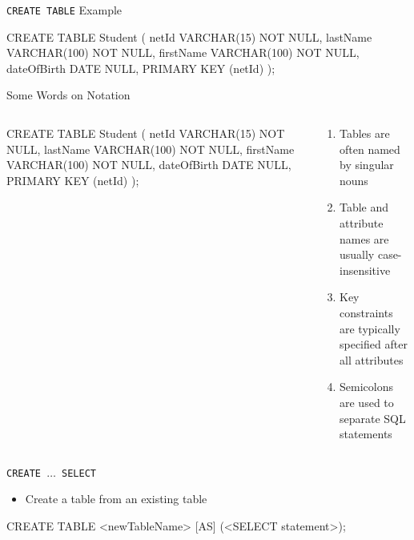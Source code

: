 \documentclass[aspectratio=169]{beamer}
\newenvironment{noindentitemize}
{ \begin{itemize}
 \setlength{\itemsep}{1.5ex}
  \setlength{\parsep}{0pt}   
  \setlength{\parskip}{0pt}
 \addtolength{\leftskip}{-2em}
 }
{ \end{itemize} }
\begin{document}
\begin{frame}[fragile]{\texttt{CREATE TABLE} Example}

\begin{SQL}
CREATE TABLE Student
(
	netId VARCHAR(15) NOT NULL,
	lastName VARCHAR(100) NOT NULL,
	firstName VARCHAR(100) NOT NULL,
	dateOfBirth DATE NULL,
	PRIMARY KEY (netId)
);	
\end{SQL}
\end{frame}

\begin{frame}[fragile]{Some Words on Notation}
\begin{columns}[T]
\begin{column}{0.5\textwidth}
\begin{SQL}
CREATE TABLE Student
(
	netId VARCHAR(15) NOT NULL,
	lastName VARCHAR(100) NOT NULL,
	firstName VARCHAR(100) NOT NULL,
	dateOfBirth DATE NULL,
	PRIMARY KEY (netId)
);	
\end{SQL}
\end{column}
\begin{column}{0.5\textwidth}
\begin{enumerate}
\item Tables are often named by singular nouns
\item Table and attribute names are usually case-insensitive
\item Key constraints are typically specified after all attributes
\item Semicolons are used to separate SQL statements
\end{enumerate}
\end{column}
\end{columns}

\end{frame}
\begin{frame}[fragile]{\texttt{CREATE $\ldots$ SELECT}}

\begin{noindentitemize}
\item Create a table from an existing table
\end{noindentitemize}

\begin{SQL}
CREATE TABLE <newTableName> [AS] 
	(<SELECT statement>);
\end{SQL}

\end{frame}
\end{document}
